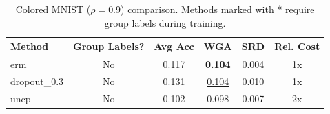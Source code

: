 \begin{table}[t]
\centering
\caption{Colored MNIST ($\rho=0.9$) comparison. Methods marked with * require group labels during training.}
\label{tab:main_results}
\begin{tabular}{lccccc}
\toprule
Method & Group Labels? & Avg Acc & WGA & SRD & Rel. Cost \\
\midrule
erm & No & 0.117 & \textbf{0.104} & 0.004 & 1x \\
dropout\_0.3 & No & 0.131 & \underline{0.104} & 0.010 & 1x \\
uncp & No & 0.102 & 0.098 & 0.007 & 2x \\
\bottomrule
\end{tabular}
\end{table}